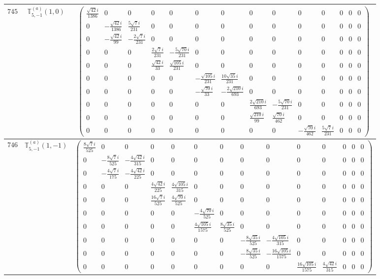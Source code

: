 \documentclass[fleqn,8pt,landscape]{jsarticle}
\begin{document}
\begin{center}
\begin{longtable}{ccc}
$ 745 $ & $ \mathbb{T}_{5,-1}^{(a)}(1,0) $ & $ \begin{pmatrix} \frac{\sqrt{42} i}{1386} & 0 & 0 & 0 & 0 & 0 & 0 & 0 & 0 & 0 & 0 & 0 & 0 & 0 \\ 0 & - \frac{\sqrt{42} i}{1386} & \frac{5 \sqrt{7} i}{231} & 0 & 0 & 0 & 0 & 0 & 0 & 0 & 0 & 0 & 0 & 0 \\ 0 & - \frac{\sqrt{42} i}{99} & - \frac{2 \sqrt{7} i}{231} & 0 & 0 & 0 & 0 & 0 & 0 & 0 & 0 & 0 & 0 & 0 \\ 0 & 0 & 0 & \frac{2 \sqrt{7} i}{231} & - \frac{5 \sqrt{70} i}{231} & 0 & 0 & 0 & 0 & 0 & 0 & 0 & 0 & 0 \\ 0 & 0 & 0 & \frac{\sqrt{42} i}{33} & \frac{\sqrt{105} i}{231} & 0 & 0 & 0 & 0 & 0 & 0 & 0 & 0 & 0 \\ 0 & 0 & 0 & 0 & 0 & - \frac{\sqrt{105} i}{231} & \frac{10 \sqrt{35} i}{231} & 0 & 0 & 0 & 0 & 0 & 0 & 0 \\ 0 & 0 & 0 & 0 & 0 & - \frac{\sqrt{70} i}{33} & - \frac{2 \sqrt{210} i}{693} & 0 & 0 & 0 & 0 & 0 & 0 & 0 \\ 0 & 0 & 0 & 0 & 0 & 0 & 0 & \frac{2 \sqrt{210} i}{693} & - \frac{5 \sqrt{70} i}{231} & 0 & 0 & 0 & 0 & 0 \\ 0 & 0 & 0 & 0 & 0 & 0 & 0 & \frac{\sqrt{210} i}{99} & \frac{\sqrt{70} i}{462} & 0 & 0 & 0 & 0 & 0 \\ 0 & 0 & 0 & 0 & 0 & 0 & 0 & 0 & 0 & - \frac{\sqrt{70} i}{462} & \frac{5 \sqrt{7} i}{231} & 0 & 0 & 0 \end{pmatrix} $ \\ \hline
$ 746 $ & $ \mathbb{T}_{5,-1}^{(a)}(1,-1) $ & $ \begin{pmatrix} \frac{8 \sqrt{7} i}{525} & 0 & 0 & 0 & 0 & 0 & 0 & 0 & 0 & 0 & 0 & 0 & 0 & 0 \\ 0 & - \frac{8 \sqrt{7} i}{525} & - \frac{4 \sqrt{42} i}{315} & 0 & 0 & 0 & 0 & 0 & 0 & 0 & 0 & 0 & 0 & 0 \\ 0 & - \frac{4 \sqrt{7} i}{175} & - \frac{4 \sqrt{42} i}{225} & 0 & 0 & 0 & 0 & 0 & 0 & 0 & 0 & 0 & 0 & 0 \\ 0 & 0 & 0 & \frac{4 \sqrt{42} i}{225} & \frac{4 \sqrt{105} i}{315} & 0 & 0 & 0 & 0 & 0 & 0 & 0 & 0 & 0 \\ 0 & 0 & 0 & \frac{16 \sqrt{7} i}{525} & \frac{4 \sqrt{70} i}{525} & 0 & 0 & 0 & 0 & 0 & 0 & 0 & 0 & 0 \\ 0 & 0 & 0 & 0 & 0 & - \frac{4 \sqrt{70} i}{525} & 0 & 0 & 0 & 0 & 0 & 0 & 0 & 0 \\ 0 & 0 & 0 & 0 & 0 & \frac{4 \sqrt{105} i}{1575} & \frac{8 \sqrt{35} i}{525} & 0 & 0 & 0 & 0 & 0 & 0 & 0 \\ 0 & 0 & 0 & 0 & 0 & 0 & 0 & - \frac{8 \sqrt{35} i}{525} & - \frac{4 \sqrt{105} i}{315} & 0 & 0 & 0 & 0 & 0 \\ 0 & 0 & 0 & 0 & 0 & 0 & 0 & - \frac{8 \sqrt{35} i}{525} & - \frac{16 \sqrt{105} i}{1575} & 0 & 0 & 0 & 0 & 0 \\ 0 & 0 & 0 & 0 & 0 & 0 & 0 & 0 & 0 & \frac{16 \sqrt{105} i}{1575} & \frac{4 \sqrt{42} i}{315} & 0 & 0 & 0 \end{pmatrix} $ \\ \hline

\end{longtable}
\end{center}
\end{document}

